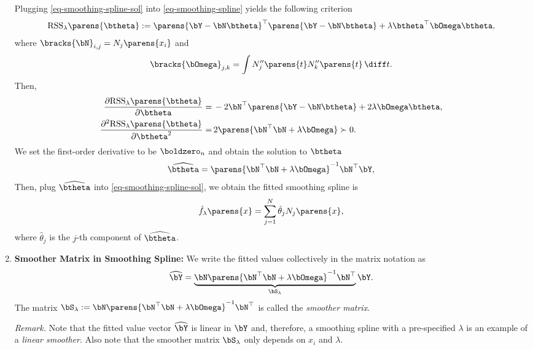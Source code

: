 \documentclass[12pt]{article}
\begin{document}
\begin{enumerate}[label=\textbf{\arabic*.}]
	Plugging \eqref{eq-smoothing-spline-sol} into \eqref{eq-smoothing-spline} yields the following criterion 
	\begin{align*}
		\mathrm{RSS}_{\lambda} \parens{\btheta} := \parens{\bY - \bN \btheta}^\top \parens{\bY - \bN \btheta} + \lambda \btheta^\top \bOmega \btheta, 
	\end{align*}
	where $\bracks{\bN}_{i,j} = N_j \parens{x_i}$ and 
	\begin{align*}
		\bracks{\bOmega}_{j,k} = \int N_{j}'' \parens{t} N_{k}'' \parens{t} \, \diff t. 
	\end{align*}
	Then, 
	\begin{align*}
		\frac{\partial \mathrm{RSS}_{\lambda} \parens{\btheta}}{\partial \btheta} = & \, -2 \bN^\top \parens{\bY - \bN\btheta} + 2 \lambda \bOmega \btheta, \\
		\frac{\partial^2 \mathrm{RSS}_{\lambda} \parens{\btheta} }{\partial \btheta^2} = & \, 2 \parens{\bN^\top \bN + \lambda \bOmega} \succ 0. 
	\end{align*}
	We set the first-order derivative to be $\boldzero_n$ and obtain the solution to $\btheta$ 
	\begin{align*}
		\widehat{\btheta} = \parens{\bN^\top \bN + \lambda \bOmega}^{-1} \bN^\top \bY, 
	\end{align*}
	Then, plug $\widehat{\btheta}$ into \eqref{eq-smoothing-spline-sol}, we obtain the fitted smoothing spline is 
	\begin{align*}
		\hat{f}_{\lambda} \parens{x} = \sum_{j=1}^N \hat{\theta}_j N_j \parens{x}, 
	\end{align*}
	where $\hat{\theta}_j$ is the $j$-th component of $\widehat{\btheta}$. 
	
	
	\item \textbf{Smoother Matrix in Smoothing Spline:} We write the fitted values collectively in the matrix notation as
	\begin{align*}
		\widehat{\bY} = \underbrace{\bN \parens{\bN^\top \bN + \lambda \bOmega}^{-1} \bN^\top}_{\bS_\lambda} \bY. 
	\end{align*}
	The matrix $\bS_\lambda := \bN \parens{\bN^\top \bN + \lambda \bOmega}^{-1} \bN^\top$ is called the \textit{smoother matrix}. 
	
	\textit{Remark.} Note that the fitted value vector $\widehat{\bY}$ is linear in $\bY$ and, therefore, a smoothing spline with a pre-specified $\lambda$ is an example of a \textit{linear smoother}. Also note that the smoother matrix $\bS_\lambda$ only depends on $x_i$ and $\lambda$. 
	

\end{enumerate}
\end{document}
